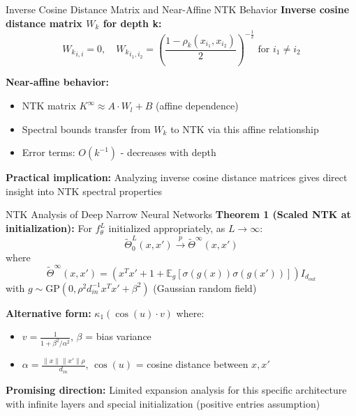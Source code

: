 \documentclass{beamer}
\newcommand{\E}{\mathbb{E}}
\newcommand{\limiting}[1]{#1^{\infty}}
\begin{document}
\begin{frame}{Inverse Cosine Distance Matrix and Near-Affine NTK Behavior}
\textbf{Inverse cosine distance matrix $W_k$ for depth k:}
\[ {W_k}_{i,i} = 0, \quad {W_k}_{i_1,i_2} = \left( \frac{1 - \rho_k(x_{i_1},x_{i_2})}{2} \right)^{-\frac{1}{2}} \text{ for } i_1 \neq i_2 \]

\textbf{Near-affine behavior:}
\begin{itemize}
\item NTK matrix $\limiting{K} \approx A \cdot W_l + B$ (affine dependence)
\item Spectral bounds transfer from $W_k$ to NTK via this affine relationship
\item Error terms: $O(k^{-1})$ - decreases with depth
\end{itemize}

\textbf{Practical implication:} Analyzing inverse cosine distance matrices gives direct insight into NTK spectral properties
\end{frame}


\begin{frame}{NTK Analysis of Deep Narrow Neural Networks}
\textbf{Theorem 1 (Scaled NTK at initialization):}
For $f^L_\theta$ initialized appropriately, as $L \to \infty$:
\[ \tilde{\Theta}^L_0(x, x') \xrightarrow{p} \tilde{\Theta}^\infty(x, x') \]
where
\[ \tilde{\Theta}^\infty(x, x') = (x^T x' + 1 + \E_g[\sigma(g(x))\sigma(g(x'))]) I_{d_{out}} \]
with $g \sim \text{GP}(0, \rho^2 d_{in}^{-1} x^T x' + \beta^2)$ (Gaussian random field)

\textbf{Alternative form:} $\kappa_1(\cos(u) \cdot v)$ where:
\begin{itemize}
\item $v = \frac{1}{1 + \beta^2/\alpha^2}$, $\beta$ = bias variance
\item $\alpha = \frac{\|x\| \|x'\| \rho}{d_{in}}$, $\cos(u)$ = cosine distance between $x, x'$
\end{itemize}

\textbf{Promising direction:} Limited expansion analysis for this specific architecture with infinite layers and special initialization (positive entries assumption)
\end{frame}
\end{document}

